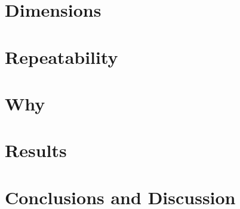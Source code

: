 \documentclass{sig-alternate-br}
\begin{document}
\section{Dimensions}
\section{Repeatability}
\section{Why}
\section{Results}
\label{sec:results}

\section{Conclusions and Discussion}
\label{sec:conclusions}


%


\balancecolumns

\onecolumn
\end{document}
